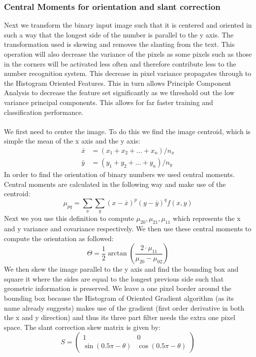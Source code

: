 \documentclass[%
        compressed,
        final,
        notitlepage,
        narroweqnarray,
        inline,
        twoside,
        ]{ieee}
\begin{document}
\subsubsection{Central Moments for orientation and slant correction}
Next we transform the binary input image such that it is centered and oriented
in such a way that the longest side of the number is parallel to the y axis. The
transformation used is skewing and removes the slanting from the text. This
operation will also decrease the variance of the pixels as some pixels such as
those in the corners will be activated less often and therefore contribute less
to the number recognition system. This decrease in pixel variance propagates
through to the Histogram Oriented Features. This in turn allows Principle
Component Analysis to decrease the feature set significantly as we threshold out
the low variance principal components. This allows for far faster training and
classification performance.\\\\
We first need to center the image. To do this we find the image centroid, which is simple the mean of the x axis and the y axis:
\begin{align}
    \bar{x}&=(x_1+x_2+...+x_n)/n_x \\
    \bar{y}&=(y_1+y_2+...+y_n)/n_y
\end{align}
In order to find the orientation of binary numbers we used central moments. Central moments are calculated in the following way and make use of the centroid:
\begin{equation}
    \mu_{pq} = \sum_x \sum_y (x - \overline{x})^p(y - \overline{y})^q f(x, y)
\end{equation}
Next we you use this definition to compute $\mu_{20}, \mu_{21}, \mu_{11}$ which represents the x and y variance and covariance respectively. We then use these central moments to compute the orientation as followed:
\begin{equation}
    \Theta = \frac{1}{2} \arctan \left(
        \frac{2 \cdot \mu_{11}}{\mu_{20} - \mu_{02}}
    \right)
\end{equation}
We then skew the image parallel to the y axis and find the bounding box and square it where the sides are equal to the longest previous side such that geometric information is preserved. We leave a one pixel border around the bounding box because the Histogram of Oriented Gradient algorithm (as its name already suggests) makes use of the gradient (first order derivative in both the x and y direction) and thus its three part filter needs the extra one pixel space. The slant correction skew matrix is given by:
\begin{equation}
    S = \begin{pmatrix}
        1 & 0 \\
        \sin(0.5 \pi - \theta) & \cos(0.5 \pi - \theta)
    \end{pmatrix}
\end{equation}
\end{document}
